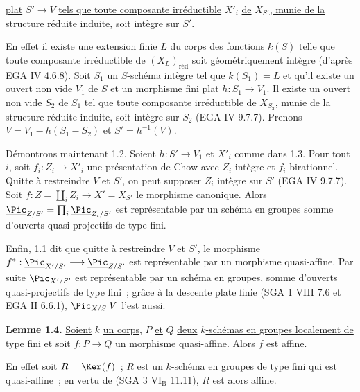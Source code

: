 
\uline{plat} \(S'\to V\) \uline{tels que toute composante irréductible} \(X'_i\) \uline{de} \(X_{S'}\)\uline{, munie de la structure réduite induite, soit intègre sur} \(S'\).

En effet il existe une extension finie \(L\) du corps des fonctions \(k(S)\) telle que toute composante irréductible de \((X_L)_{\text{réd}}\) soit géométriquement intègre (d'après EGA IV 4.6.8). Soit \(S_1\) un \(S\)-schéma intègre tel que \(k(S_1)=L\) et qu'il existe un ouvert non vide \(V_1\) de \(S\) et un morphisme fini plat \(h:S_1\to V_1\). Il existe un ouvert non vide \(S_2\) de \(S_1\) tel que toute composante irréductible de \(X_{S_2}\), munie de la structure réduite induite, soit intègre sur \(S_2\) (EGA IV 9.7.7). Prenons \(V=V_1-h(S_1-S_2)\) et \(S'=h^{-1}(V)\).

Démontrons maintenant 1.2. Soient \(h:S'\to V_1\) et \(X'_i\) comme dans 1.3. Pour tout \(i\), soit \(f_i:Z_i\to X'_i\) une présentation de Chow avec \(Z_i\) intègre et \(f_i\) birationnel. Quitte à restreindre \(V\) et \(S'\), on peut supposer \(Z_i\) intègre sur \(S'\) (EGA IV 9.7.7). Soit \(f:Z=\coprod_i Z_i\longrightarrow X'=X_{S'}\) le morphisme canonique. Alors \(\underline{\Pic}_{Z/S'}=\prod_i\underline{\Pic}_{Z_i/S'}\) est représentable par un schéma en groupes somme d'ouverts quasi-projectifs de type fini.

Enfin, 1.1 dit que quitte à restreindre \(V\) et \(S'\), le morphisme \(f^*:\underline{\Pic}_{X'/S'}\longrightarrow \underline{\Pic}_{Z/S'}\) est représentable par un morphisme quasi-affine. Par suite \(\Pic_{X'/S'}\) est représentable par un schéma en groupes, somme d'ouverts quasi-projectifs de type fini~; grâce à la descente plate finie (SGA 1 VIII 7.6 et EGA II 6.6.1), \(\Pic_{X/S}|V\) l'est aussi.

\textbf{Lemme 1.4.} \uline{Soient} \(k\) \uline{un corps,} \(P\) \uline{et} \(Q\) \uline{deux} \(k\)\uline{-schémas en groupes localement de type fini et soit} \(f:P\to Q\) \uline{un morphisme quasi-affine. Alors} \(f\) \uline{est affine.}

En effet soit \(R=\Ker(f)\)~; \(R\) est un \(k\)-schéma en groupes de type fini qui est quasi-affine~; en vertu de (SGA 3 \(\mathrm{VI}_{\mathrm B}\) 11.11), \(R\) est alors affine.
